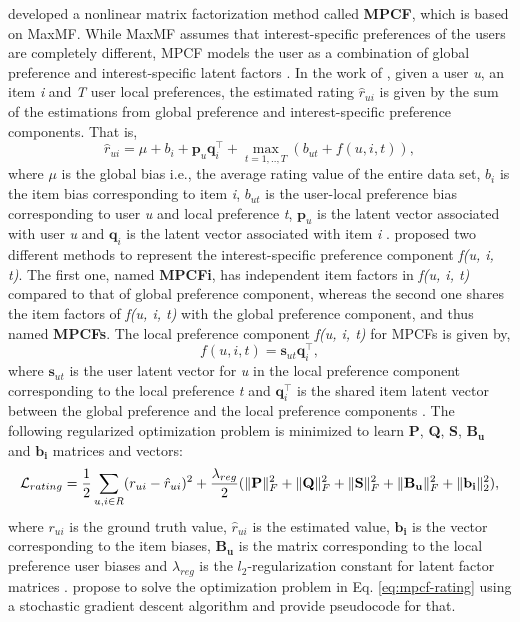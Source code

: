 \cite{Kabbur2015} developed a nonlinear matrix factorization method called \textbf{MPCF}, which is based on MaxMF.
While MaxMF assumes that interest-specific preferences of the users are completely different, MPCF models the user as a combination of global preference and interest-specific latent factors \cite{Kabbur2015}.
In the work of \cite{Kabbur2015}, given a user \textit{u}, an item \textit{i} and \textit{T} user local preferences, the estimated rating \textit{$\hat{r}_{ui}$} is given by the sum of the estimations from global preference and interest-specific preference components.
That is,
\begin{equation}
\hat{r}_{ui} = \mu + b_i + \textbf{p}_u \textbf{q}_i^\intercal + \max_{t=1,..,T} (b_{ut} + f(u, i, t)),
\end{equation}
where $\mu$ is the global bias i.e., the average rating value of the entire data set, $b_i$ is the item bias corresponding to item \textit{i}, $b_{ut}$ is the user-local preference bias corresponding to user \textit{u} and local preference \textit{t}, $\textbf{p}_u$ is the latent vector associated with user \textit{u} and $\textbf{q}_i$ is the latent vector associated with item \textit{i} \cite{Kabbur2015}.
\cite{Kabbur2015} proposed two different methods to represent the interest-specific preference component \textit{f(u, i, t)}.
The first one, named \textbf{MPCFi}, has independent item factors in \textit{f(u, i, t)} compared to that of global preference component, whereas the second one shares the item factors of \textit{f(u, i, t)} with the global preference component, and thus named \textbf{MPCFs}.
The local preference component \textit{f(u, i, t)} for MPCFs is given by,
\begin{equation}
f(u, i, t) = \textbf{s}_{ut} \textbf{q}_i^\intercal,
\end{equation}
where $\textbf{s}_{ut}$ is the user latent vector for \textit{u} in the local preference component corresponding to the local preference \textit{t} and $\textbf{q}_i^\intercal$ is the shared item latent vector between the global preference and the local preference components \cite{Kabbur2015}.
The following regularized optimization problem is minimized to learn \textbf{P}, \textbf{Q}, \textbf{S}, $\mathbf{B_u}$ and $\mathbf{b_i}$ matrices and vectors:
\begin{equation}
\mathcal{L}_{rating} = \frac{1}{2} \sum_{u,i \in R} (r_{ui} - \hat{r}_{ui})^2 + \frac{\lambda_{reg}}{2} (\lVert{\ensuremath{\mathbf{P}}}\rVert_F^2 + \lVert{\ensuremath{\mathbf{Q}}}\rVert_F^2 + \lVert{\ensuremath{\mathbf{S}}}\rVert_F^2 + \lVert{\ensuremath{\mathbf{B_u}}}\rVert_F^2 + \lVert{\ensuremath{\mathbf{b_i}}}\rVert_2^2),\label{eq:mpcf-rating}
\end{equation}
where $r_{ui}$ is the ground truth value,  $\hat{r}_{ui}$ is the estimated value, $\mathbf{b_i}$ is the vector corresponding to the item biases, $\mathbf{B_u}$ is the matrix corresponding to the local preference user biases and $\lambda_{reg}$ is the $l_2$-regularization constant for latent factor matrices \cite{Kabbur2015}.
\cite{Kabbur2015} propose to solve the optimization problem in Eq. \ref{eq:mpcf-rating} using a stochastic gradient descent algorithm and provide pseudocode for that.


